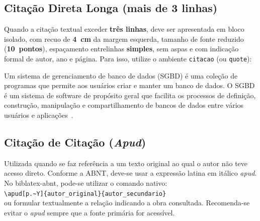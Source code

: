 \documentclass[ppgc,mestrado,biblatex]{iiufrgs}
\begin{document}
\subsection{Citação Direta Longa (mais de 3 linhas)}
Quando a citação textual exceder \textbf{três linhas}, deve ser apresentada em bloco isolado, com recuo de \textbf{4~cm} da margem esquerda, tamanho de fonte reduzido (\textbf{10~pontos}), espaçamento entrelinhas \textbf{simples}, sem aspas e com indicação formal de autor, ano e página. Para isso, utilize o ambiente \texttt{citacao} (ou \texttt{quote}):

\begin{citacao}
Um sistema de gerenciamento de banco de dados (SGBD) é uma coleção de programas que permite aos usuários criar e manter um banco de dados. O SGBD é um sistema de software de propósito geral que facilita os processos de definição, construção, manipulação e compartilhamento de bancos de dados entre vários usuários e aplicações~\cite[p.~4]{elmasri2005sistemas}.
\end{citacao}

\subsection{Citação de Citação (\textit{Apud})}
Utilizada quando se faz referência a um texto original ao qual o autor não teve acesso direto. Conforme a ABNT, deve-se usar a expressão latina em itálico \textit{apud}. No \textsf{biblatex-abnt}, pode-se utilizar o comando nativo:\\
\verb|\apud[p.~Y]{autor_original}{autor_secundario}|\\
ou formular textualmente a relação indicando a obra consultada. Recomenda-se evitar o \textit{apud} sempre que a fonte primária for acessível.

%

\printbibliography
\end{document}
